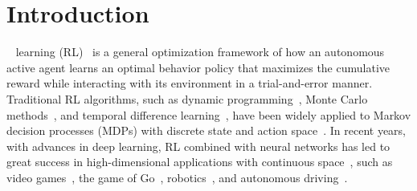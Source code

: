 \documentclass[journal]{IEEEtran}
\begin{document}
\section{Introduction}~\label{introduction}
 learning (RL)~\citep{sutton2018reinforcement} is a general optimization framework of how an autonomous active agent learns an optimal behavior policy that maximizes the cumulative reward while interacting with its environment in a trial-and-error manner.
Traditional RL algorithms, such as dynamic programming~\citep{bellman1966dynamic}, Monte Carlo methods~\citep{tesauro1996line}, and temporal difference learning~\citep{watkins1992q}, have been widely applied to Markov decision processes (MDPs) with discrete state and action space~\citep{wang2019incremental, chen2013fidelity, luo2016model, zhang2016fmrq}. 
In recent years, with advances in deep learning, RL combined with neural networks has led to great success in high-dimensional applications with continuous space~\citep{zhu2016iterative, xu2007kernel, zheng2018deep, yu2018reusable, wang2022dirichlet}, 
such as video games~\citep{mnih2015human, vinyals2019grandmaster, pan2018multisource}, the game of Go~\citep{silver2017mastering}, robotics~\citep{duan2016benchmarking,wang2022lifelong}, and autonomous driving~\citep{li2019reinforcement}.
\end{document}
